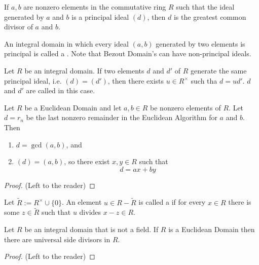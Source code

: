 \begin{prop}
    If $a,b$ are nonzero elements in the commutative ring $R$ such that the ideal generated by $a$ and $b$ is a principal ideal $(d)$, then $d$ is the greatest common divisor of $a$ and $b$.
\end{prop}

\begin{defn}
    An integral domain in which every ideal $(a,b)$ generated by two elements is principal is called a . Note that Bezout Domain's can have non-principal ideals.
\end{defn}

\begin{prop}
    Let $R$ be an integral domain. If two elements $d$ and $d'$ of $R$ generate the same principal ideal, i.e. $(d) = (d')$, then there exists $u \in R^{\times}$ such tha $d = ud'$. $d$ and $d'$ are called  in this case.
\end{prop}

\begin{thm}
    Let $R$ be a Euclidean Domain and let $a,b \in R$ be nonzero elements of $R$. Let $d = r_n$ be the last nonzero remainder in the Euclidean Algorithm for $a$ and $b$. Then \begin{enumerate}
        \item $d = \gcd(a,b)$, and 
        \item $(d) = (a,b)$, so there exist $x,y \in R$ such that \begin{equation}
                d = ax + by
        \end{equation}
    \end{enumerate}
\end{thm}
\begin{proof}
    (Left to the reader)
\end{proof}

\begin{defn}
    Let $\widetilde{R} := R^{\times}\cup \{0\}$. An element $u \in R - \widetilde{R}$ is called a  if for every $x \in R$ there is some $z \in \widetilde{R}$ such that $u$ divides $x-z \in R$.
\end{defn}


\begin{prop}
    Let $R$ be an integral domain that is not a field. If $R$ is a Euclidean Domain then there are universal side divisors in $R$.
\end{prop}
\begin{proof}
    (Left to the reader)
\end{proof}